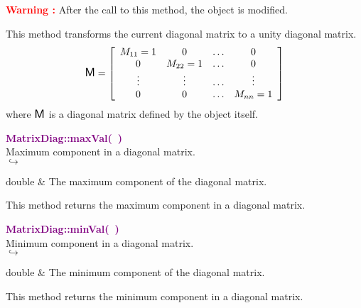 \hspace*{10mm}\textcolor{red}{\textbf{Warning :}} After the call to this method, the object is modified.

This method transforms the current diagonal matrix to a unity diagonal matrix.
\begin{equation*}
\mbox{\large\ensuremath{\mathsf{M}}}=\left[\begin{array}{cccc}
  M_{11}=1 & 0 & \hdots & 0\\
  0 & M_{22}=1 & \hdots & 0\\
  \vdots & \vdots & \hdots & \vdots\\
  0 & 0 & \hdots & M_{nn}=1
  \end{array}\right]
\end{equation*}
where $\mbox{\large\ensuremath{\mathsf{M}}}$ is a diagonal matrix defined by the object itself.

\textcolor{purple}{\textbf{MatrixDiag::maxVal(~)}}\label{MatrixDiag::maxVal()}\\
Maximum component in a diagonal matrix.\\ \hspace*{5mm}$\hookrightarrow$
\vspace*{-2em}\begin{tcolorbox}[grow to left by=-1cm, width=\textwidth-1cm,myArgs,tabularx={l|R}]
double & The maximum component of the diagonal matrix.
\end{tcolorbox}

This method returns the maximum component in a diagonal matrix.

\textcolor{purple}{\textbf{MatrixDiag::minVal(~)}}\label{MatrixDiag::minVal()}\\
Minimum component in a diagonal matrix.\\ \hspace*{5mm}$\hookrightarrow$
\vspace*{-2em}\begin{tcolorbox}[grow to left by=-1cm, width=\textwidth-1cm,myArgs,tabularx={l|R}]
double & The minimum component of the diagonal matrix.
\end{tcolorbox}

This method returns the minimum component in a diagonal matrix.

